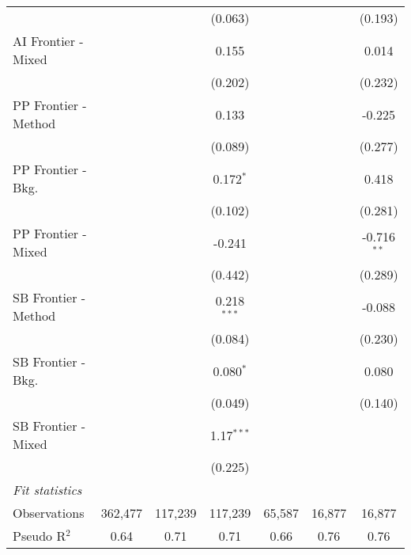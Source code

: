 \begin{tabular}{lcccccc}
                        &               &               & (0.063)       &               &         & (0.193)\\   
   AI Frontier - Mixed  &               &               & 0.155         &               &         & 0.014\\   
                        &               &               & (0.202)       &               &         & (0.232)\\   
   PP Frontier - Method &               &               & 0.133         &               &         & -0.225\\   
                        &               &               & (0.089)       &               &         & (0.277)\\   
   PP Frontier - Bkg.   &               &               & 0.172$^{*}$   &               &         & 0.418\\   
                        &               &               & (0.102)       &               &         & (0.281)\\   
   PP Frontier - Mixed  &               &               & -0.241        &               &         & -0.716$^{**}$\\   
                        &               &               & (0.442)       &               &         & (0.289)\\   
   SB Frontier - Method &               &               & 0.218$^{***}$ &               &         & -0.088\\   
                        &               &               & (0.084)       &               &         & (0.230)\\   
   SB Frontier - Bkg.   &               &               & 0.080$^{*}$   &               &         & 0.080\\   
                        &               &               & (0.049)       &               &         & (0.140)\\   
   SB Frontier - Mixed  &               &               & 1.17$^{***}$  &               &         &   \\   
                        &               &               & (0.225)       &               &         &   \\   
   \midrule
   \emph{Fit statistics}\\
   Observations         & 362,477       & 117,239       & 117,239       & 65,587        & 16,877  & 16,877\\  
   Pseudo R$^2$         & 0.64          & 0.71          & 0.71          & 0.66          & 0.76    & 0.76\\  
   

\end{tabular}
